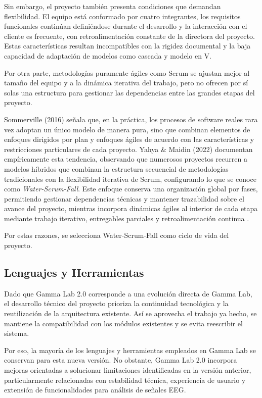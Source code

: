 \documentclass{article}
\begin{document}
Sin embargo, el proyecto también presenta condiciones que demandan flexibilidad. El equipo está conformado por cuatro integrantes, los requisitos funcionales continúan definiéndose durante el desarrollo y la interacción con el cliente es frecuente, con retroalimentación constante de la directora del proyecto. Estas características resultan incompatibles con la rigidez documental y la baja capacidad de adaptación de modelos como cascada y modelo en V.

Por otra parte, metodologías puramente ágiles como Scrum se ajustan mejor al tamaño del equipo y a la dinámica iterativa del trabajo, pero no ofrecen por sí solas una estructura para gestionar las dependencias entre las grandes etapas del proyecto.

Sommerville (2016) señala que, en la práctica, los procesos de software reales rara vez adoptan un único modelo de manera pura, sino que combinan elementos de enfoques dirigidos por plan y enfoques ágiles de acuerdo con las características y restricciones particulares de cada proyecto.  Yahya \& Maidin (2022) documentan empíricamente esta tendencia, observando que numerosos proyectos recurren a modelos híbridos que combinan la estructura secuencial de metodologías tradicionales con la flexibilidad iterativa de Scrum, configurando lo que se conoce como \textit{Water-Scrum-Fall}. Este enfoque conserva una organización global por fases, permitiendo gestionar dependencias técnicas y mantener trazabilidad sobre el avance del proyecto, mientras incorpora dinámicas ágiles al interior de cada etapa mediante trabajo iterativo, entregables parciales y retroalimentación continua \cite{yahya2022}.

Por estas razones, se selecciona Water-Scrum-Fall como ciclo de vida del proyecto.

\subsection{Lenguajes y Herramientas}

Dado que Gamma Lab 2.0 corresponde a una evolución directa de Gamma Lab, el desarrollo técnico del proyecto prioriza la continuidad tecnológica y la reutilización de la arquitectura existente. Así se aprovecha el trabajo ya hecho, se mantiene la compatibilidad con los módulos existentes y se evita reescribir el sistema.

Por eso, la mayoría de los lenguajes y herramientas empleados en Gamma Lab se conservan para esta nueva versión. No obstante, Gamma Lab 2.0 incorpora mejoras orientadas a solucionar limitaciones identificadas en la versión anterior, particularmente relacionadas con estabilidad técnica, experiencia de usuario y extensión de funcionalidades para análisis de señales EEG.
\end{document}
